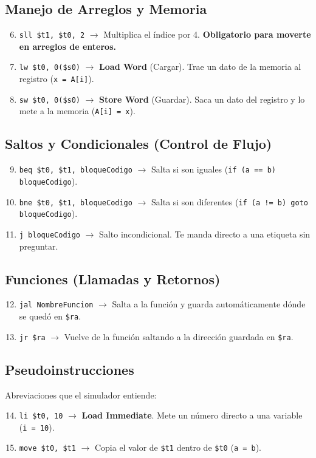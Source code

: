 \documentclass[10pt, a4paper]{article}
\begin{document}
\subsection{Manejo de Arreglos y Memoria}
\begin{enumerate}
    \setcounter{enumi}{5}
    \item \texttt{sll \$t1, \$t0, 2}   $\rightarrow$ Multiplica el índice por 4. \textbf{Obligatorio para moverte en arreglos de enteros.}
    \item \texttt{lw \$t0, 0(\$s0)}    $\rightarrow$ \textbf{Load Word} (Cargar). Trae un dato de la memoria al registro (\texttt{x = A[i]}).
    \item \texttt{sw \$t0, 0(\$s0)}    $\rightarrow$ \textbf{Store Word} (Guardar). Saca un dato del registro y lo mete a la memoria (\texttt{A[i] = x}).
\end{enumerate}

\subsection{Saltos y Condicionales (Control de Flujo)}
\begin{enumerate}
    \setcounter{enumi}{8}
    \item \texttt{beq \$t0, \$t1, bloqueCodigo} $\rightarrow$ Salta si son iguales (\texttt{if (a == b) bloqueCodigo}).
    \item \texttt{bne \$t0, \$t1, bloqueCodigo} $\rightarrow$ Salta si son diferentes (\texttt{if (a != b) goto bloqueCodigo}).
    \item \texttt{j bloqueCodigo}               $\rightarrow$ Salto incondicional. Te manda directo a una etiqueta sin preguntar.
\end{enumerate}

\subsection{Funciones (Llamadas y Retornos)}
\begin{enumerate}
    \setcounter{enumi}{11}
    \item \texttt{jal NombreFuncion}    $\rightarrow$ Salta a la función y guarda automáticamente dónde se quedó en \texttt{\$ra}.
    \item \texttt{jr \$ra}             $\rightarrow$ Vuelve de la función saltando a la dirección guardada en \texttt{\$ra}.
\end{enumerate}

\subsection{Pseudoinstrucciones}
Abreviaciones que el simulador entiende:
\begin{enumerate}
    \setcounter{enumi}{13}
    \item \texttt{li \$t0, 10}          $\rightarrow$ \textbf{Load Immediate}. Mete un número directo a una variable (\texttt{i = 10}).
    \item \texttt{move \$t0, \$t1}       $\rightarrow$ Copia el valor de \texttt{\$t1} dentro de \texttt{\$t0} (\texttt{a = b}).
\end{enumerate}
\end{document}

